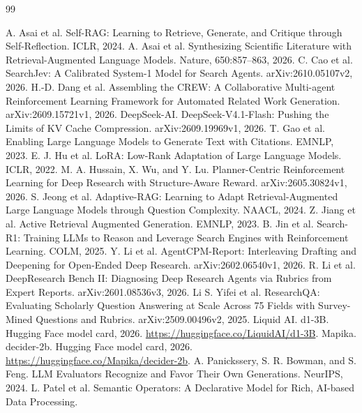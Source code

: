 \documentclass[11pt, letterpaper]{article}
\begin{document}
\begin{thebibliography}{99}\small\raggedright
\setlength{\itemsep}{1pt}
A. Asai et al. Self-RAG: Learning to Retrieve, Generate, and Critique through Self-Reflection. ICLR,
2024.
A. Asai et al. Synthesizing Scientific Literature with Retrieval-Augmented Language Models. Nature,
650:857--863, 2026.
C. Cao et al. SearchJev: A Calibrated System-1 Model for Search Agents. arXiv:2610.05107v2, 2026.
H.-D. Dang et al. Assembling the CREW: A Collaborative Multi-agent Reinforcement Learning Framework
for Automated Related Work Generation. arXiv:2609.15721v1, 2026.
DeepSeek-AI. DeepSeek-V4.1-Flash: Pushing the Limits of KV Cache Compression. arXiv:2609.19969v1,
2026.
T. Gao et al. Enabling Large Language Models to Generate Text with Citations. EMNLP, 2023.
E. J. Hu et al. LoRA: Low-Rank Adaptation of Large Language Models. ICLR, 2022.
M. A. Hussain, X. Wu, and Y. Lu. Planner-Centric Reinforcement Learning for Deep Research with
Structure-Aware Reward. arXiv:2605.30824v1, 2026.
S. Jeong et al. Adaptive-RAG: Learning to Adapt Retrieval-Augmented Large Language Models through
Question Complexity. NAACL, 2024.
Z. Jiang et al. Active Retrieval Augmented Generation. EMNLP, 2023.
B. Jin et al. Search-R1: Training LLMs to Reason and Leverage Search Engines with Reinforcement
Learning. COLM, 2025.
Y. Li et al. AgentCPM-Report: Interleaving Drafting and Deepening for Open-Ended Deep Research.
arXiv:2602.06540v1, 2026.
R. Li et al. DeepResearch Bench II: Diagnosing Deep Research Agents via Rubrics from Expert Reports.
arXiv:2601.08536v3, 2026.
Li S. Yifei et al. ResearchQA: Evaluating Scholarly Question Answering at Scale Across 75 Fields with
Survey-Mined Questions and Rubrics. arXiv:2509.00496v2, 2025.
Liquid AI. d1-3B. Hugging Face model card, 2026. \url{https://huggingface.co/LiquidAI/d1-3B}.
Mapika. decider-2b. Hugging Face model card, 2026. \url{https://huggingface.co/Mapika/decider-2b}.
A. Panickssery, S. R. Bowman, and S. Feng. LLM Evaluators Recognize and Favor Their Own
Generations. NeurIPS, 2024.
L. Patel et al. Semantic Operators: A Declarative Model for Rich, AI-based Data Processing.

\end{thebibliography}
\end{document}
